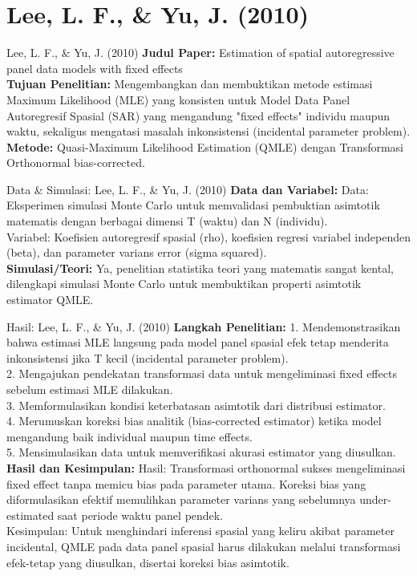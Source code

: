 \documentclass{beamer}
\begin{document}
\section{Lee, L. F., \& Yu, J. (2010)}
\begin{frame}[allowframebreaks]{Lee, L. F., \& Yu, J. (2010)}
\textbf{Judul Paper:} Estimation of spatial autoregressive panel data models with fixed effects \\[0.3cm]
\textbf{Tujuan Penelitian:} Mengembangkan dan membuktikan metode estimasi Maximum Likelihood (MLE) yang konsisten untuk Model Data Panel Autoregresif Spasial (SAR) yang mengandung "fixed effects" individu maupun waktu, sekaligus mengatasi masalah inkonsistensi (incidental parameter problem). \\[0.3cm]
\textbf{Metode:} Quasi-Maximum Likelihood Estimation (QMLE) dengan Transformasi Orthonormal bias-corrected.
\end{frame}

\begin{frame}[allowframebreaks]{Data \& Simulasi: Lee, L. F., \& Yu, J. (2010)}
\textbf{Data dan Variabel:} Data: Eksperimen simulasi Monte Carlo untuk memvalidasi pembuktian asimtotik matematis dengan berbagai dimensi T (waktu) dan N (individu).\\ Variabel: Koefisien autoregresif spasial (rho), koefisien regresi variabel independen (beta), dan parameter varians error (sigma squared). \\[0.3cm]
\textbf{Simulasi/Teori:} Ya, penelitian statistika teori yang matematis sangat kental, dilengkapi simulasi Monte Carlo untuk membuktikan properti asimtotik estimator QMLE.
\end{frame}

\begin{frame}[allowframebreaks]{Hasil: Lee, L. F., \& Yu, J. (2010)}
\textbf{Langkah Penelitian:} 1. Mendemonstrasikan bahwa estimasi MLE langsung pada model panel spasial efek tetap menderita inkonsistensi jika T kecil (incidental parameter problem).\\ 2. Mengajukan pendekatan transformasi data untuk mengeliminasi fixed effects sebelum estimasi MLE dilakukan.\\ 3. Memformulasikan kondisi keterbatasan asimtotik dari distribusi estimator.\\ 4. Merumuskan koreksi bias analitik (bias-corrected estimator) ketika model mengandung baik individual maupun time effects.\\ 5. Mensimulasikan data untuk memverifikasi akurasi estimator yang diusulkan. \\[0.3cm]
\textbf{Hasil dan Kesimpulan:} Hasil: Transformasi orthonormal sukses mengeliminasi fixed effect tanpa memicu bias pada parameter utama. Koreksi bias yang diformulasikan efektif memulihkan parameter varians yang sebelumnya under-estimated saat periode waktu panel pendek.\\ Kesimpulan: Untuk menghindari inferensi spasial yang keliru akibat parameter incidental, QMLE pada data panel spasial harus dilakukan melalui transformasi efek-tetap yang diusulkan, disertai koreksi bias asimtotik.
\end{frame}
\end{document}
